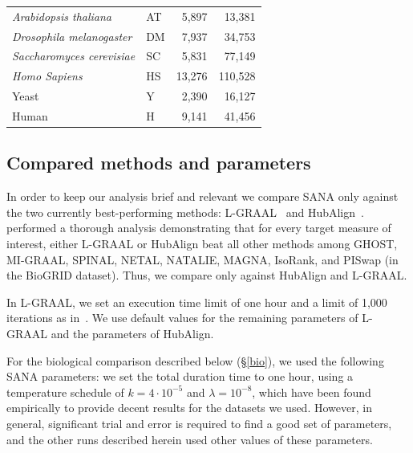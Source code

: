 \documentclass{bioinfo}
\begin{document}
\begin{table}[h]
\begin{tabular}{llrr}
\textit{Arabidopsis thaliana}      & AT                  & 5,897                                 & 13,381                                    \\
\textit{Drosophila melanogaster}   & DM                  & 7,937                                 & 34,753                                    \\
\textit{Saccharomyces cerevisiae}      & SC                  & 5,831                                 & 77,149                                    \\
\textit{Homo Sapiens}   & HS                  & 13,276                                 & 110,528                                   \\ \hline
Yeast                              & Y                   & 2,390                                 & 16,127                                    \\
Human                              & H                   & 9,141                                 & 41,456                                    \\ \hline
\end{tabular}
\end{table}

\subsection{Compared methods and parameters}

In order to keep our analysis brief and relevant we compare SANA only against the two currently best-performing methods: L-GRAAL~\citep{LGRAAL} and HubAlign~\citep{HubAlign}. \cite{LGRAAL} performed a thorough analysis demonstrating that for every target measure of interest, either L-GRAAL or HubAlign beat all other methods among GHOST, MI-GRAAL, SPINAL, NETAL, NATALIE, MAGNA, IsoRank, and PISwap (in the BioGRID dataset). Thus, we compare only against HubAlign and L-GRAAL.

In L-GRAAL, we set an execution time limit of one hour and a limit of 1,000 iterations as in~\citep{LGRAAL}. We use default values for the remaining parameters of L-GRAAL and the parameters of HubAlign.

For the biological comparison described below (\S \ref{bio}), we used the following SANA parameters: we set the total duration time to one hour, using 
a temperature schedule of $k=4\cdot 10^{-5}$ and $\lambda=10^{-8}$, which have been found empirically to provide decent results for the datasets we used. However, in general, significant trial and error is required to find a good set of parameters, and the other runs described herein used other values of these parameters. %
\end{document}
